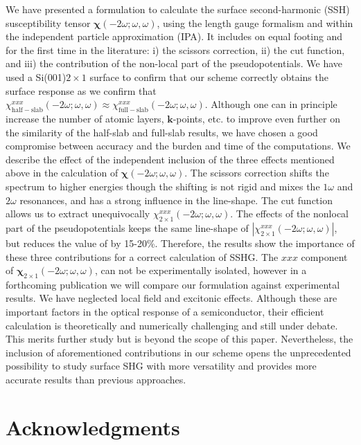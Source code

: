 \documentclass[floatfix,prb,aps,superscriptaddress,showpacs,11pt,preprint,letterpaper]{revtex4}
\begin{document}
We have presented a formulation to calculate the surface second-harmonic
(SSH) susceptibility tensor $\boldsymbol{\chi}(-2\omega;\omega,\omega)$, using the length gauge
formalism and within the independent particle approximation (IPA).
It includes on equal footing and for the first time in the literature: 
i) the scissors correction, ii) the cut function, and iii) the
contribution of the non-local part of the pseudopotentials.
We have used a Si(001)$2\times 1$ surface to confirm that our scheme
correctly obtains the surface response as we confirm
that 
$\chi_{\mathrm{half-slab}}^{xxx}(-2\omega;\omega,\omega) 
\approx
\chi_{\mathrm{full-slab}}^{xxx}(-2\omega;\omega,\omega) 
. 
$
Although one can in principle increase the number of atomic layers,
$\mathbf{k}$-points, etc. to
improve even further on the similarity of the half-slab and full-slab results, we
have chosen a good compromise between accuracy and the burden and time
of the computations. 
We describe the effect of the independent inclusion of the three
effects mentioned above in the calculation of  
$\boldsymbol{\chi}(-2\omega;\omega,\omega)$. 
The scissors correction shifts the spectrum to  
higher energies though the shifting is not rigid and mixes the 
$1\omega$ and $2\omega$ resonances,  
and has a strong influence in the line-shape.
 The cut function allows us  
to extract unequivocally $\chi^{xxx}_{2\times 1}(-2\omega;\omega,\omega)$.
 The effects of the nonlocal part of the pseudopotentials  
keeps the same line-shape of $|\chi^{xxx}_{2\times
  1}(-2\omega;\omega,\omega)|$,
but  
reduces the value of   
by 15-20\%. 
Therefore,  
the results show the importance of these three contributions for a correct calculation 
of SSHG.
The $xxx$ component of  
$\boldsymbol{\chi}_{2\times 1}(-2\omega;\omega,\omega)$, 
can not be
experimentally isolated,
however in a forthcoming publication 
we will compare our formulation 
against
experimental 
results. 
We have neglected
local field 
and excitonic effects.
Although these are important factors in the optical response of a semiconductor,
their efficient calculation is theoretically and 
numerically challenging and still 
under debate.\cite{beyond}  
This merits further study but is beyond the scope of this paper. 
Nevertheless, the inclusion of aforementioned contributions 
in
our scheme opens the unprecedented possibility to study 
surface SHG with more versatility and provides 
more accurate results than previous approaches. 

\section{Acknowledgments}
\end{document}
